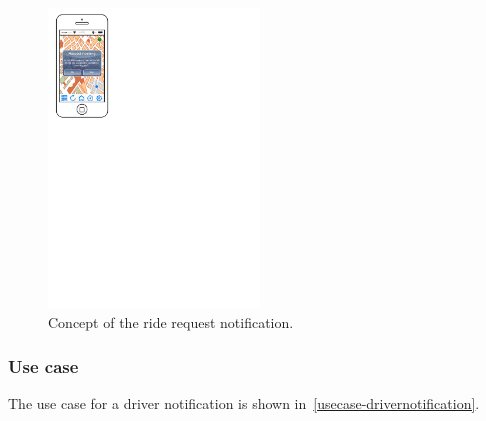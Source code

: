 \begin{figure}
\begin{center}
\includegraphics[width=0.5\textwidth]{mockup/RideRequest.pdf}
\caption{Concept of the ride request notification.}
\label{fig:mockup-riderequest}
\end{center}
\end{figure}

\subsubsection{Use case}
The use case for a driver notification is shown in~\autoref{usecase-drivernotification}.

